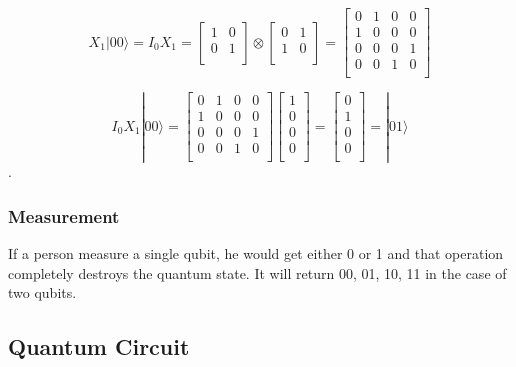 \begin{equation}
 X_1 |00\rangle = 
I_0X_1 = 
\begin{bmatrix}
1 & 0 \\
0 & 1 \\
\end{bmatrix}
\otimes
\begin{bmatrix}
0 & 1 \\
1 & 0 \\
\end{bmatrix}
= \begin{bmatrix}
0 & 1 & 0 & 0 \\
1 & 0 & 0 & 0 \\
0 & 0 & 0 & 1 \\
0 & 0 & 1 & 0 \\
\end{bmatrix}
\end{equation}

\begin{equation}
I_0 X_1 |00\rangle
=  \begin{bmatrix}
0 & 1 & 0 & 0 \\
1 & 0 & 0 & 0 \\
0 & 0 & 0 & 1 \\
0 & 0 & 1 & 0 \\
\end{bmatrix}
\left[
\begin{array}{c}
1 \\
0 \\
0 \\
0 \\
\end{array}
\right] 
= \left[
\begin{array}{c}
0 \\
1 \\
0 \\
0 \\
\end{array}
\right] 
= |01\rangle
\end{equation}.

\subsubsection{Measurement}

If a person measure a single qubit, he would get either 0 or 1 and that operation completely destroys the quantum state.  It will return 00, 01, 10, 11 in the case of two qubits.

\subsection{Quantum Circuit}

